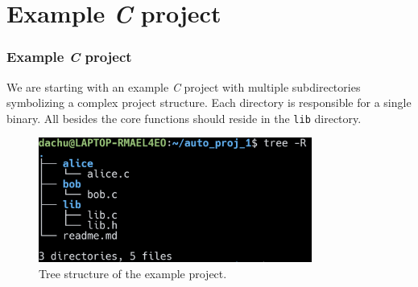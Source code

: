 \section{Example \textit{C} project}

\begin{frame}
    \frametitle{Example \textit{C} project}

    We are starting with an example \textit{C} project with \alert{multiple subdirectories} symbolizing a complex project structure. Each directory is responsible for a single binary. All besides the core functions should reside in the \texttt{lib} directory.

    \begin{figure}[H]
        \centering
        \includegraphics[width=0.8\textwidth]{../figure/init_state.png}
        \caption*{Tree structure of the example project.}
    \end{figure}
\end{frame}


